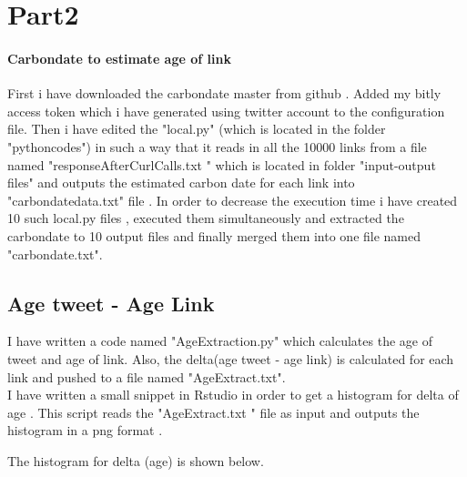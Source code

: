 \documentclass[12pt]{Report}
\begin{document}
\section{Part2}

\paragraph{Carbondate to estimate age of link}

First i have downloaded the carbondate master from github . 
Added my bitly access token which i have generated using twitter account to the configuration file. Then i have edited the "local.py" (which is  located in the folder "pythoncodes") in such a way that it reads in all the 10000 links from a file named "responseAfterCurlCalls.txt " which is located in folder "input-output files" and outputs the estimated carbon date for each link into "carbondatedata.txt" file . In order to decrease the execution time i have created 10 such local.py files , executed them simultaneously and  extracted the carbondate to 10 output files and finally merged them into one file named "carbondate.txt".

\subsection{Age tweet - Age Link}

I have written a code named "AgeExtraction.py" which calculates the age of tweet and age of link. Also, the delta(age tweet - age link) is calculated for each link and pushed to a file named "AgeExtract.txt".\\
I have written a small snippet in Rstudio in order to get a histogram for delta of age . This script reads the "AgeExtract.txt " file as input and outputs the histogram in a png format .

The histogram for delta (age) is  shown below.
\end{document}
